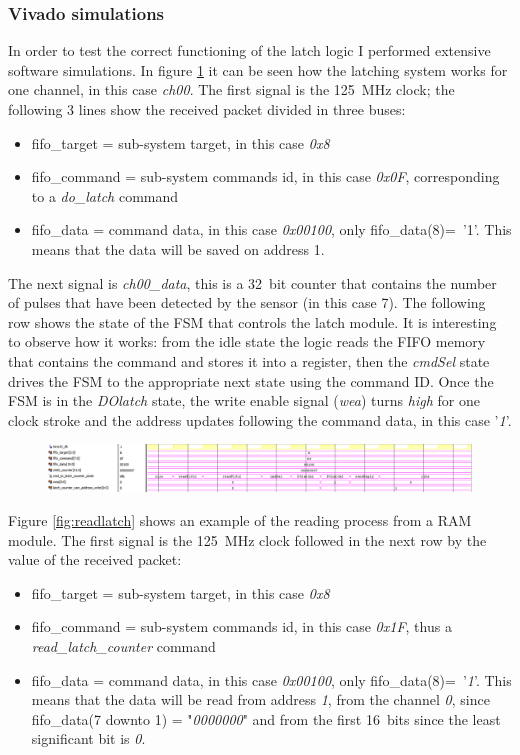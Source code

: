 \subsubsection{Vivado simulations}
\noindent In order to test the correct functioning of the latch logic I performed extensive software simulations. In figure \ref{fig:dolatch} it can be seen how the latching system works for one channel, in this case \textit{ch00}. The first signal is the 125~MHz clock; the following 3 lines show the received packet divided in three buses:
\begin{itemize}
	\item fifo\_target = sub-system target, in this case \textit{0x8}
	\item fifo\_command = sub-system commands id, in this case \textit{0x0F}, corresponding to a \textit{do\_latch} command
	\item fifo\_data = command data, in this case \textit{0x00100}, only fifo\_data(8)=~'1'. This means that the data will be saved on address 1.
\end{itemize} 
The next signal is \textit{ch00\_data}, this is a 32~bit counter that contains the number of pulses that have been detected by the sensor (in this case 7).
The following row shows the state of the FSM that controls the latch module. It is interesting to observe how it works:
from the idle state the logic reads the FIFO memory that contains the command and stores it into a register, then the \textit{cmdSel} state drives the FSM to the appropriate next state using the command ID.
Once the FSM is in the \textit{DOlatch} state, the write enable signal (\textit{wea}) turns \textit{high} for one clock stroke and the address updates following the command data, in this case '\textit{1}'.  
\begin{figure}[H]
	\centering
	\includegraphics[width=1.0\linewidth]{IMG/ch4/LATCHsimulations/DOLATCH}
	\caption{}
	\label{fig:dolatch}
\end{figure}
\noindent Figure \ref{fig:readlatch} shows an example of the reading process from a RAM module. The first signal is the 125~MHz clock followed in the next row by the value of the received packet:
\begin{itemize}
	\item fifo\_target = sub-system target, in this case \textit{0x8}
	\item fifo\_command = sub-system commands id, in this case \textit{0x1F}, thus a \textit{read\_latch\_counter} command
	\item fifo\_data = command data, in this case \textit{0x00100}, only fifo\_data(8)=~'\textit{1}'. This means that the data will be read from address \textit{1}, from the channel \textit{0}, since fifo\_data(7 downto 1) = "\textit{0000000}" and from the first 16~bits since the least significant bit is \textit{0}.
\end{itemize}
